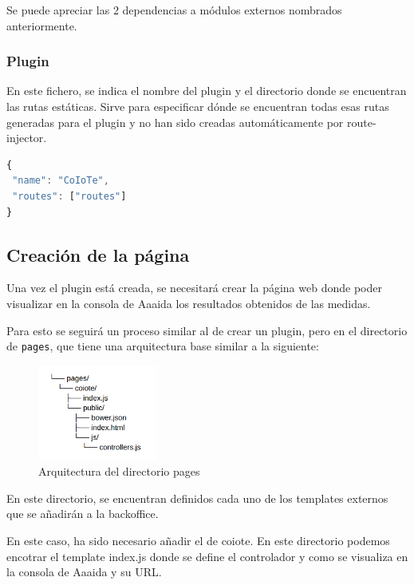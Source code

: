 Se puede apreciar las 2 dependencias a módulos externos nombrados anteriormente. 

\subsubsection{Plugin} 

En este fichero, se indica el nombre del plugin y el directorio donde se encuentran
las rutas estáticas. Sirve para especificar dónde se encuentran todas esas rutas generadas para el plugin y no han sido creadas automáticamente por route-injector. 

\begin{lstlisting}[language=JavaScript]
{
 "name": "CoIoTe",
 "routes": ["routes"]
}
\end{lstlisting}

\subsection{Creación de la página}

Una vez el plugin está creada, se necesitará crear la página web donde poder visualizar en la consola de Aaaida los resultados obtenidos de las medidas. 

Para esto se seguirá un proceso similar al de crear un plugin, pero en el directorio de \texttt{pages}, que tiene una arquitectura base similar a la siguiente:  

\begin{figure}[htb]
\begin{center}
\includegraphics[width=0.35\textwidth]{./setup/arc2}
\caption{Arquitectura del directorio pages}
\end{center}
\end{figure}


En este directorio, se encuentran definidos cada uno de los templates externos que se añadirán a la backoffice.

En este caso, ha sido necesario añadir el de coiote. En este directorio podemos encotrar el template index.js donde se define el controlador y como se visualiza en la consola de Aaaida y su URL. 

